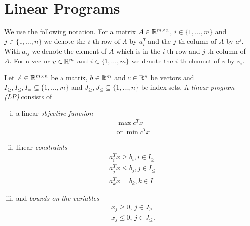 \section{Linear Programs}
\label{sec:linear-programming}
We use the following notation. For a matrix $A \in \mathbb{R}^{m\times n}$, $i\in
\{1,\ldots,m\}$ and $ j \in \{ 1,\ldots,n\}$ we denote 
the  $i$-th row of  $A$ by  $a^T_i$ and the $j$-th column of $A$ by
$a^j$. With  $a_{ij}$ we denote the element of $A$ which is in the $i$-th
row and $j$-th column of $A$. For a vector $v \in \mathbb{R}^m$ and $i\in
\{1,\ldots,m\}$ we denote the $i$-th element of $v$ by $v_i$. 



\begin{definition}
\label{def:9}
Let  $A \in \mathbb{R}^{m\times n}$ be a matrix,  $b \in \mathbb{R}^{m}$ and $c \in \mathbb{R}^n$ be
vectors and  $I_\geq,I_\leq,I_= \subseteq \{1,\ldots,m\}$
and $J_\geq,J_\leq \subseteq\{1,\ldots,n\}$ be index sets. A \emph{linear program (LP)}
consists of 
\begin{enumerate}[i)]
\item a linear \emph{objective function}
  \begin{displaymath}
    \begin{array}{c}
      \max c^T x \\
      \text{or } \min c^Tx
    \end{array}
  \end{displaymath}
\item linear \emph{constraints} 
  \begin{displaymath}
    \begin{array}{c}
      a_i^T x \geq b_i, i \in {I_\geq} \\ 
      a_j^T x \leq b_j, j \in {I_\leq} \\ 
      a_k^T x = b_k, k \in {I_=} 
    \end{array}
  \end{displaymath}
\item and  \emph{bounds on the variables} 
  \begin{displaymath}
    \begin{array}{c}
      x_j \geq0, \, j \in J_\geq \\
      x_j \leq0, \, j \in J_\leq. 
    \end{array}
  \end{displaymath}
\end{enumerate}

\end{definition}




